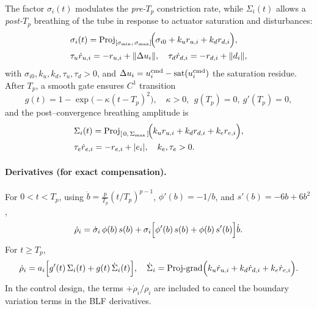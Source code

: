 \documentclass[pdflatex,sn-mathphys-num]{sn-jnl}%
\theoremstyle{thmstyleone}%
\theoremstyle{thmstyletwo}%
\theoremstyle{thmstylethree}%
\begin{document}
The factor $\sigma_i(t)$ modulates the \emph{pre-$T_p$} constriction rate, while $\Sigma_i(t)$ allows a \emph{post-$T_p$} breathing of the tube in response to actuator saturation and disturbances:
\begin{align}
&\sigma_i(t)=\operatorname{Proj}_{[\sigma_{\min},\,\sigma_{\max}]}\!\Bigl(\sigma_{i0}+k_u r_{u,i}+k_d r_{d,i}\Bigr),\label{eq:gppf-sigma}\\
&\tau_u \dot r_{u,i}=-r_{u,i}+\|\Delta u_i\|,\quad
  \tau_d \dot r_{d,i}=-r_{d,i}+\|d_i\|, \nonumber
\end{align}
with $\sigma_{i0},k_u,k_d,\tau_u,\tau_d>0$, and $\Delta u_i=u^{\rm cmd}_i-\operatorname{sat}(u^{\rm cmd}_i)$ the saturation residue.
After $T_p$, a smooth gate ensures $C^1$ transition
\begin{equation}\label{eq:gppf-gate}
g(t)=1-\exp\!\bigl(-\kappa (t-T_p)^2\bigr),\quad \kappa>0,\ \ g(T_p)=0,\ g'(T_p)=0,
\end{equation}
and the post–convergence breathing amplitude is
\begin{align}
&\Sigma_i(t)=\operatorname{Proj}_{[\,0,\,\Sigma_{\max}\,]}\!\Bigl(k_u r_{u,i}+k_d r_{d,i}+k_e r_{e,i}\Bigr),\label{eq:gppf-Sigma}\\
&\tau_e \dot r_{e,i}=-r_{e,i}+|e_i|, \quad k_e,\tau_e>0.\nonumber
\end{align}

\paragraph{Derivatives (for exact compensation).}
For $0<t<T_p$, using $\dot b=\frac{p}{T_p}(t/T_p)^{p-1}$, $\phi'(b)=-1/b$, and $s'(b)=-6b+6b^2$,
\begin{equation}\label{eq:gppf-drho-pre}
\dot\rho_i
= \dot\sigma_i\,\phi(b)\,s(b)
+ \sigma_i\Bigl[\phi'(b)\,s(b)+\phi(b)\,s'(b)\Bigr]\dot b .
\end{equation}
For $t\ge T_p$,
\begin{equation}\label{eq:gppf-drho-post}
\dot\rho_i
= a_i\Bigl[g'(t)\,\Sigma_i(t)+g(t)\,\dot\Sigma_i(t)\Bigr],\quad
\dot\Sigma_i=\text{Proj-grad}\Bigl(k_u\dot r_{u,i}+k_d\dot r_{d,i}+k_e\dot r_{e,i}\Bigr).
\end{equation}
In the control design, the terms $+\dot\rho_i/\rho_i$ are included to cancel the boundary variation terms in the BLF derivatives.
\end{document}
